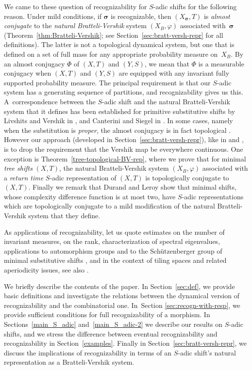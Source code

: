 \documentclass{amsart}
\theoremstyle{definition}
\theoremstyle{remark}
\numberwithin{equation}{section}
\begin{document}
We came to these question of recognizability for $S$-adic shifts for the following reason.
Under mild conditions, if $\boldsymbol{\sigma}$ is recognizable, then $(X_{\boldsymbol{\sigma}},T)$ is \emph{almost conjugate} to the \emph{natural Bratteli-Vershik} system $(X_B,\varphi)$ associated with~$\boldsymbol{\sigma}$  (Theorem~\ref{thm:Bratteli-Vershik}; see Section~\ref{sec:bratt-versh-repr} for all definitions).
The latter is not a topological dynamical system, but one that is defined on a set of full mass for any  appropriate probability measure on~$X_B$. By an almost conjugacy $\Phi$ of $(X,T)$ and $(Y,S)$, we mean that $\Phi$ is a measurable conjugacy when $(X,T)$ and $(Y,S)$ are equipped with any invariant fully supported probability measure.
The principal requirement is that our $S$-adic system has a generating sequence of partitions, and recognizability gives us this.
A~correspondence between the $S$-adic shift and the natural Bratteli-Vershik system that it defines has been established for primitive substitutive shifts by Livshits and Vershik in \cite{Livshits-Vershik}, and Canterini and Siegel in \cite{CS01b,CanSie:2001}.
In some cases, namely when the substitution is \emph{proper},  the almost conjugacy is in fact topological \cite{Durand-Host-Skau}. 
However our approach (developed in Section~\ref{sec:bratt-versh-repr}), like in \cite{Livshits-Vershik} and  \cite{CS01b,CanSie:2001},  is to drop the requirement that the Vershik map be everywhere continuous.
One exception is Theorem~\ref{tree-topological-BV-rep}, where we prove that for minimal \emph{tree shifts} $(X,T)$, the  natural Bratteli-Vershik system $(X_B,\varphi)$ associated with a \emph{return time} $S$-adic representation of $(X,T)$ is topologically conjugate to $(X,T)$.
Finally we remark that Durand and Leroy \cite{Durand-Leroy:2012} show that minimal shifts, whose complexity difference function is at most two, have $S$-adic representations which are topologically conjugate to a mild modification of the natural Bratteli-Vershik system that they define.

As applications of recognizability, let us quote estimates on the number of invariant measures,  on the rank, characterization of  spectral eigenvalues, applications to automorphism groups \cite{DonDurMassPet} and to the Sch\"utzenberger group of minimal substitutive shifts \cite{AlmCost}, and in the context of tiling spaces and related aperiodicity issues, see also  \cite{Solomyak:98,HolRadSad,FrankSadun,AndressRobinson}.


We  briefly describe the contents of the paper. 
In Section~\ref{sec:def}, we provide basic definitions and investigate the relations between the  dynamical version of recognizability and the combinatorial one.
In~Section \ref{sec:recogn-with-resp}, we provide sufficient conditions for full recognizability of a morphism.
In Sections~\ref{main_S_adic} and~\ref{main_S_adic-2} we describe our results on $S$-adic shifts, and we stress the difference between eventual recognizability and recognizability in Section~\ref{examples}.
Finally in Section~\ref{sec:bratt-versh-repr}, we discuss the implications of recognizability in terms of an $S$-adic shift's natural representation as a Bratteli-Vershik system. 
\end{document}
